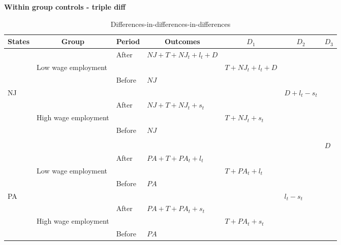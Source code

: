 \documentclass[notes=show]{beamer}
\begin{document}
\begin{frame}[plain]
\begin{center}
\textbf{Within group controls - triple diff}
\end{center}

\begin{table}\centering
		\caption{Differences-in-differences-in-differences}
		\tiny
		\begin{center}
		\begin{tabular}{lll|l|lll}
		\hline \hline
		\multicolumn{1}{l}{\textbf{States}}&
		\multicolumn{1}{c}{\textbf{Group}}&
		\multicolumn{1}{c}{\textbf{Period}}&
		\multicolumn{1}{c}{\textbf{Outcomes}}&
		\multicolumn{1}{c}{$D_1$}&
		\multicolumn{1}{c}{$D_2$}&
		\multicolumn{1}{c}{$D_3$}\\
		\hline
		&&After	&$NJ+T+NJ_t+l_t+D$					\\
	&Low wage employment			&&&$T+NJ_t+l_t+D$			\\
		&&Before	&$NJ$					\\
NJ					&&&&&$D+l_t-s_t$			\\
		&&After	&$NJ+T+NJ_t+s_t$					\\
	&High wage employment		&&	&$T+NJ_t+s_t$				\\
		&&Before	&$NJ$					\\
								\\
&&&&&&$D$
\\
		&&After	&$PA+T+PA_t+l_t$				\\
	&Low wage employment			&&&$T+PA_t+l_t$ \\				
		&&Before	&$PA$					\\
PA					&&&&&$l_t-s_t$		\\
		&&After	&$PA+T+PA_t+s_t$					\\
	&High wage employment		&&&	$T+PA_t+s_t$				\\
		&&Before	&$PA$					\\
		\hline \hline
		\end{tabular}
		\end{center}
	\end{table}

\end{frame}
\end{document}

